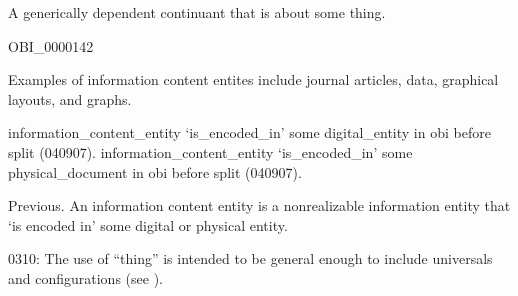 \documentclass[letterpaper,10pt,english]{sphinxmanual}
\begin{document}
\begin{sphinxShadowBox}

\sphinxAtStartPar
{\hyperref[\detokenize{doc-BFO_0000031::doc}]{}}
\end{sphinxShadowBox}

\begin{sphinxShadowBox}

\sphinxAtStartPar
A generically dependent continuant that is about some thing.
\end{sphinxShadowBox}

\begin{sphinxShadowBox}

\sphinxAtStartPar
OBI\_0000142
\end{sphinxShadowBox}

\begin{sphinxShadowBox}

\sphinxAtStartPar
Examples of information content entites include journal articles, data, graphical layouts, and graphs.
\end{sphinxShadowBox}

\begin{sphinxShadowBox}

\sphinxAtStartPar
information\_content\_entity ‘is\_encoded\_in’ some digital\_entity in obi before split (040907). information\_content\_entity ‘is\_encoded\_in’ some physical\_document in obi before split (040907).

\sphinxAtStartPar
Previous. An information content entity is a non\sphinxhyphen{}realizable information entity that ‘is encoded in’ some digital or physical entity.

\sphinxhyphen{}03\sphinxhyphen{}10: The use of “thing” is intended to be general enough to include universals and configurations (see ).
\end{sphinxShadowBox}

\begin{sphinxShadowBox}

\sphinxAtStartPar
{}
\end{sphinxShadowBox}
\end{document}
